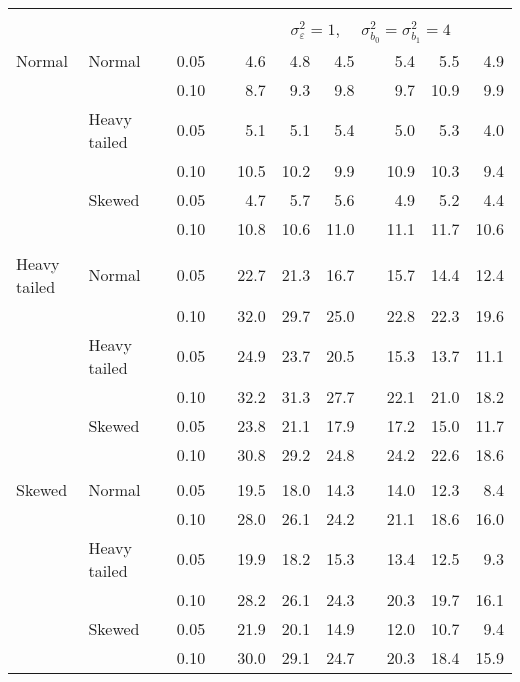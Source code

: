 \begin{table}[ht]
\begin{scriptsize}
\begin{tabular}{ll p{.1cm} c p{.1cm} rrr p{.1cm} rrr}
&&&&&&&&&&&\\
& && && \multicolumn{7}{c}{$\sigma_{\varepsilon}^2 = 1$, \ \ $\sigma_{b_0}^2 = \sigma_{b_1}^2 = 4$} \\ \cline{6-12}
\rowcolor{gray!20} Normal & Normal &  & 0.05 &  & 4.6 & 4.8 & 4.5 &  & 5.4 & 5.5 & 4.9 \\ 
\rowcolor{gray!20}   &  &  & 0.10 &  & 8.7 & 9.3 & 9.8 &  & 9.7 & 10.9 & 9.9 \\ 
\rowcolor{gray!20}   & Heavy tailed &  & 0.05 &  & 5.1 & 5.1 & 5.4 &  & 5.0 & 5.3 & 4.0 \\ 
\rowcolor{gray!20}   &  &  & 0.10 &  & 10.5 & 10.2 & 9.9 &  & 10.9 & 10.3 & 9.4 \\ 
\rowcolor{gray!20}   & Skewed &  & 0.05 &  & 4.7 & 5.7 & 5.6 &  & 4.9 & 5.2 & 4.4 \\ 
\rowcolor{gray!20}   &  &  & 0.10 &  & 10.8 & 10.6 & 11.0 &  & 11.1 & 11.7 & 10.6 \\ 
&&&&&&&&&&&\\
  Heavy tailed & Normal &  & 0.05 &  & 22.7 & 21.3 & 16.7 &  & 15.7 & 14.4 & 12.4 \\ 
   &  &  & 0.10 &  & 32.0 & 29.7 & 25.0 &  & 22.8 & 22.3 & 19.6 \\ 
   & Heavy tailed &  & 0.05 &  & 24.9 & 23.7 & 20.5 &  & 15.3 & 13.7 & 11.1 \\ 
   &  &  & 0.10 &  & 32.2 & 31.3 & 27.7 &  & 22.1 & 21.0 & 18.2 \\ 
   & Skewed &  & 0.05 &  & 23.8 & 21.1 & 17.9 &  & 17.2 & 15.0 & 11.7 \\ 
   &  &  & 0.10 &  & 30.8 & 29.2 & 24.8 &  & 24.2 & 22.6 & 18.6 \\ 
&&&&&&&&&&&\\
  Skewed & Normal &  & 0.05 &  & 19.5 & 18.0 & 14.3 &  & 14.0 & 12.3 & 8.4 \\ 
   &  &  & 0.10 &  & 28.0 & 26.1 & 24.2 &  & 21.1 & 18.6 & 16.0 \\ 
   & Heavy tailed &  & 0.05 &  & 19.9 & 18.2 & 15.3 &  & 13.4 & 12.5 & 9.3 \\ 
   &  &  & 0.10 &  & 28.2 & 26.1 & 24.3 &  & 20.3 & 19.7 & 16.1 \\ 
   & Skewed &  & 0.05 &  & 21.9 & 20.1 & 14.9 &  & 12.0 & 10.7 & 9.4 \\ 
   &  &  & 0.10 &  & 30.0 & 29.1 & 24.7 &  & 20.3 & 18.4 & 15.9 \\ 

\hline
\end{tabular}
\end{scriptsize}
\end{table}


